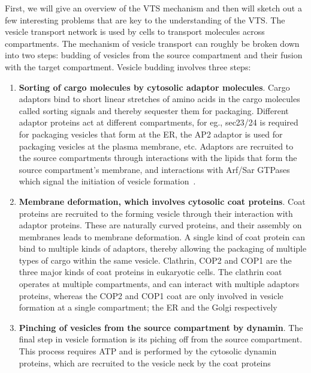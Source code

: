 First, we will give an overview of the VTS mechanism and then will sketch out a few interesting problems that are key to the understanding of the VTS.
%
The vesicle transport network is used by cells to transport molecules across compartments.
% 
The mechanism of vesicle transport can roughly be broken down into two steps: budding of vesicles from the source compartment and their fusion with the target compartment.
%
Vesicle budding involves three steps:
\begin{enumerate}
	\item  \textbf{Sorting of cargo molecules by cytosolic adaptor molecules}. 
	Cargo adaptors bind to short linear stretches of amino acids in the cargo molecules called sorting signals and thereby sequester them for packaging. 
	Different adaptor proteins act at different compartments, for eg., sec23/24 is required
	for packaging vesicles that form at the ER, the AP2 adaptor is used for packaging vesicles at the plasma membrane, etc. 
	Adaptors are recruited to the source compartments through interactions with
	the lipids that form the source compartment's membrane, and interactions with Arf/Sar GTPases which signal the initiation of vesicle formation~\cite{paczkowski2015cargo}.
	
	\item \textbf{Membrane deformation, which involves cytosolic coat proteins}.
	Coat proteins are recruited to the forming vesicle through their interaction with adaptor proteins. 
	These are naturally curved proteins, and their assembly on membranes leads to membrane deformation.
	A single kind of coat protein can bind to multiple kinds of adaptors, thereby allowing the packaging of multiple types of cargo within the same vesicle. 
	Clathrin, COP2 and COP1 are the three major kinds of coat proteins
	in eukaryotic cells. 
	The clathrin coat operates at multiple compartments, and can interact with
	multiple adaptors proteins, whereas the COP2 and COP1 coat are only involved in vesicle formation at a single compartment; the ER and the Golgi respectively~\cite{faini2013vesicle}
	
	
	\item \textbf{Pinching of vesicles from the source compartment by dynamin}.
	The final step in vesicle formation is its piching off from the source compartment.
	This process requires ATP and is performed by the cytosolic dynamin proteins, which are recruited to the vesicle neck by the coat proteins~\cite{cocucci2014dynamin}
\end{enumerate}

